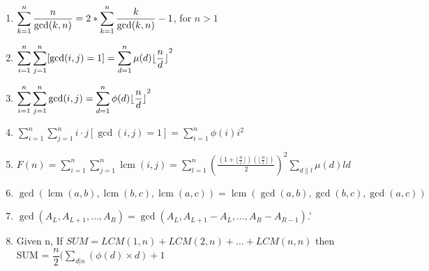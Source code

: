 \begin{enumerate}
\item $\displaystyle \displaystyle \sum_{k=1}^n \frac{n}{\gcd(k, n)} = 2 * \displaystyle \sum_{k=1}^n \frac{k}{\gcd(k, n)} - 1$,  for  $n > 1$
\item $\displaystyle \displaystyle \sum_{i=1}^n \sum_{j=1}^n [\gcd(i, j) = 1] = \displaystyle \sum_{d=1}^n \mu(d) \lfloor {\frac{n}{d} \rfloor}^2$
\item $\displaystyle \displaystyle \sum_{i=1}^n \displaystyle\sum_{j=1}^n \gcd(i, j) = \displaystyle \sum_{d=1}^n \phi(d) \lfloor {\frac{n}{d} \rfloor}^2$
\item $\displaystyle \sum_{i=1}^n \sum_{j=1}^n i \cdot j[\gcd(i, j) = 1] = \sum_{i=1}^n \phi(i)i^2$
\item $\displaystyle F(n) = \displaystyle \sum_{i=1}^n \displaystyle \sum_{j=1}^n \operatorname{lcm}(i, j) = \displaystyle \sum_{l=1}^n {\left(\frac{\left( 1 + \lfloor{\frac{n}{l} \rfloor} \right) \left( \lfloor{\frac{n}{l} \rfloor} \right)} {2} \right)}^2 \displaystyle \sum_{d\|l} \mu(d)ld$
\item $\displaystyle \gcd(\operatorname{lcm}(a, b), \operatorname{lcm}(b, c), \operatorname{lcm}(a, c)) = \operatorname{lcm}(\gcd(a, b), \gcd(b, c), \gcd(a, c))$
\item $\displaystyle \gcd(A_L, A_{L+1},  \ldots , A_R) = \gcd(A_L, A_{L+1} - A_L,  \ldots , A_R - A_{R-1})$.'
\item Given n, If $SUM = LCM(1,n) + LCM(2,n) +  \ldots  + LCM(n,n)$  
     then SUM = $\displaystyle \dfrac{n}{2}( \displaystyle\sum _{ d| n}\left( \phi \left( d\right) \times d\right) +1$
\end{enumerate}

